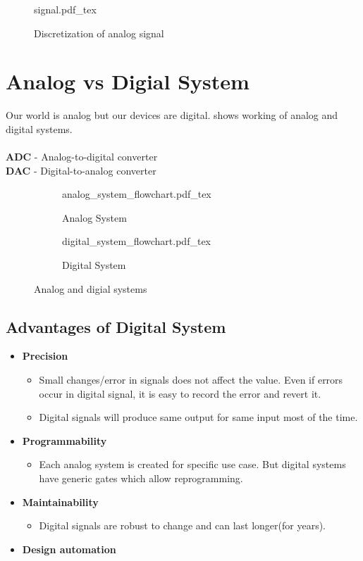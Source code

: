 \documentclass[oneside]{book}
\newcommand{\incfig}[1]{%
    {#1.pdf_tex}
}
\newcommand{\halfsubfig}[2][1]{
	\begin{subfigure}{0.45\linewidth}
		\centering
		\incfig{#1}
		\caption{#2}
	\end{subfigure}
}
\begin{document}
\begin{figure}[H]
	\centering
	\incfig{signal}
	\caption{Discretization of analog signal}
	\label{discretization_plot}
\end{figure}

\section{Analog vs Digial System}
Our world is analog but our devices are digital.  shows working of analog and digital systems.
\\\\
\noindent \textbf{ADC} - Analog-to-digital converter\\
\noindent \textbf{DAC} - Digital-to-analog converter

\begin{figure}[H]
	\centering
	\halfsubfig[analog_system_flowchart]{Analog System}
	\halfsubfig[digital_system_flowchart]{Digital System}
	\caption{Analog and digial systems}
	\label{analog_digital_work_flow}
\end{figure}

\subsection{Advantages of Digital System}
\begin{itemize}
	\item \textbf{Precision}
	      \begin{itemize}
		      \item Small changes/error in signals does not affect the value. Even if errors occur in digital signal, it is easy to record the error and revert it.
		      \item Digital signals will produce same output for same input most of the time.
	      \end{itemize}
	\item \textbf{Programmability}
	      \begin{itemize}
		      \item Each analog system is created for specific use case. But digital systems have generic gates which allow reprogramming.
	      \end{itemize}
	\item \textbf{Maintainability}
	      \begin{itemize}
		      \item Digital signals are robust to change and can last longer(for years).
	      \end{itemize}
	\item \textbf{Design automation}
\end{itemize}
\end{document}
